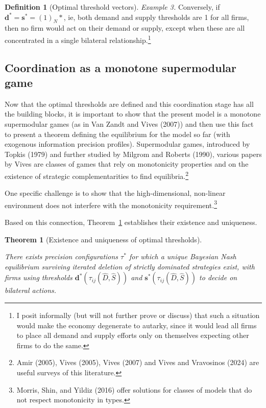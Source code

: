 \documentclass[
]{article}
\theoremstyle{plain}
\newtheorem{theorem}{Theorem}[section]
\theoremstyle{definition}
\newtheorem{definition}{Definition}[section]
\theoremstyle{remark}
\begin{document}
\begin{definition}[Optimal threshold
vectors]
\emph{Example 3.} Conversely, if
\(\mathbf{d}^* = \mathbf{s}^* = (1)_N*\), ie, both demand and supply
thresholds are 1 for all firms, then no firm would act on their demand
or supply, except when these are all concentrated in a single bilateral
relationship.\footnote{I posit informally (but will not further prove or
  discuss) that such a situation would make the economy degenerate to
  autarky, since it would lead all firms to place all demand and supply
  efforts only on themselves expecting other firms to do the same.}

\end{definition}

\subsection{Coordination as a monotone supermodular
game}\label{coordination-as-a-monotone-supermodular-game}

Now that the optimal thresholds are defined and this coordination stage
has all the building blocks, it is important to show that the present
model is a monotone supermodular games (as in Van Zandt and Vives
(2007)) and then use this fact to present a theorem defining the
equilibrium for the model so far (with exogenous information precision
profiles). Supermodular games, introduced by Topkis (1979) and further
studied by Milgrom and Roberts (1990), various papers by Vives are
classes of games that rely on monotonicity properties and on the
existence of strategic complementarities to find equilibria.\footnote{Amir
  (2005), Vives (2005), Vives (2007) and Vives and Vravosinos (2024) are
  useful surveys of this literature.}

One specific challenge is to show that the high-dimensional, non-linear
environment does not interfere with the monotonicity
requirement.\footnote{Morris, Shin, and Yildiz (2016) offer solutions
  for classes of models that do not respect monotonicity in types.}

Based on this connection, Theorem~\ref{thm-optmthresh} establishes their
existence and uniqueness.

\begin{theorem}[Existence and uniqueness of optimal
thresholds]\protect\hypertarget{thm-optmthresh}{}\label{thm-optmthresh}

There exists precision configurations \(\tau^*\) for which a unique
Bayesian Nash equilibrium surviving iterated deletion of strictly
dominated strategies exist, with firms using thresholds
\(\mathbf{d}^*(\tau_{ij}(\hat{D}, \hat{S}))\) and
\(\mathbf{s}^*(\tau_{ij}(\hat{D}, \hat{S}))\) to decide on bilateral
actions.

\end{theorem}
\end{document}
